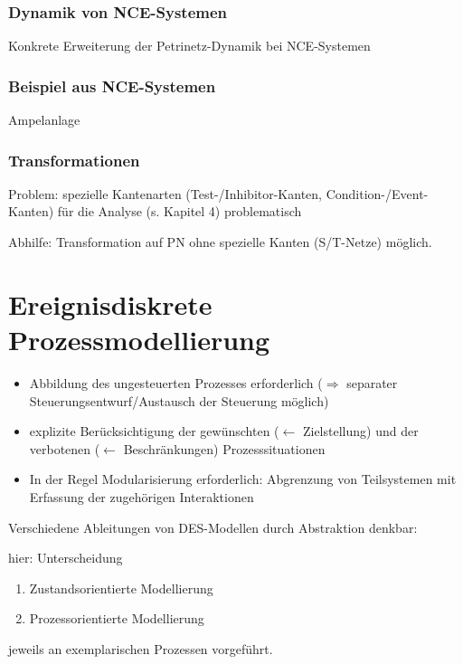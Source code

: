 \subsubsection{Dynamik von NCE-Systemen}
Konkrete Erweiterung der Petrinetz-Dynamik bei NCE-Systemen 

\subsubsection{Beispiel aus NCE-Systemen}
Ampelanlage 


\subsubsection{Transformationen}

\begin{descFixed}[2]
	\item[Problem:] spezielle Kantenarten (Test-/Inhibitor-Kanten, Condition-/Event-Kanten) für die Analyse (s. Kapitel 4) problematisch
	\item[Abhilfe:] Transformation auf PN ohne spezielle Kanten (S/T-Netze) möglich. 
\end{descFixed}



\section{Ereignisdiskrete Prozessmodellierung}
\begin{itemize}
	\item Abbildung des ungesteuerten Prozesses erforderlich ($\Rightarrow$ separater Steuerungsentwurf/Austausch der Steuerung möglich)
	\item explizite Berücksichtigung der gewünschten ($\leftarrow$ Zielstellung) und der verbotenen ($\leftarrow$ Beschränkungen) Prozesssituationen
	\item In der Regel Modularisierung erforderlich: Abgrenzung von Teilsystemen mit Erfassung der zugehörigen Interaktionen
\end{itemize}

Verschiedene Ableitungen von DES-Modellen durch Abstraktion denkbar:


hier: Unterscheidung
\begin{enumerate}
	\item Zustandsorientierte Modellierung
	\item Prozessorientierte Modellierung
\end{enumerate}
jeweils an exemplarischen Prozessen vorgeführt.

